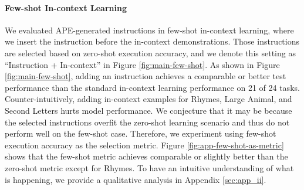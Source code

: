 
\paragraph{Few-shot In-context Learning}
We evaluated APE-generated instructions in  few-shot in-context learning, where we insert the instruction before the in-context demonstrations. Those instructions are selected based on zero-shot execution accuracy, and we denote this setting as ``Instruction + In-context'' in Figure \ref{fig:main-few-shot}. As shown in Figure \ref{fig:main-few-shot}, adding an instruction achieves a comparable or better test performance than the standard in-context learning performance on 21 of 24 tasks. Counter-intuitively, adding in-context examples for Rhymes, Large Animal, and Second Letters hurts model performance. We conjecture that it may be because the selected instructions overfit the zero-shot learning scenario and thus do not perform well on the few-shot case. Therefore, we experiment using few-shot execution accuracy as the selection metric. Figure \ref{fig:app-few-shot-as-metric} shows that the few-shot metric achieves comparable or slightly better than the zero-shot metric except for Rhymes. To have an intuitive understanding of what is happening, we provide a qualitative analysis in Appendix \ref{sec:app_ii}. 

